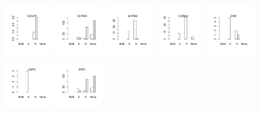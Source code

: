 \documentclass[utf8]{frontiersSCNS} %
\begin{document}
\begin{figure}[h!]
\includegraphics[width=0.19\textwidth]{figures/validation_plots/cckar_0p8_valplot.pdf}
\includegraphics[width=0.19\textwidth]{figures/validation_plots/chrm1_0p8_valplot.pdf}
\includegraphics[width=0.19\textwidth]{figures/validation_plots/chrm2_0p8_valplot.pdf}
\includegraphics[width=0.19\textwidth]{figures/validation_plots/chrm3_0p8_valplot.pdf}
\vspace*{-15pt} %
\includegraphics[width=0.19\textwidth]{figures/validation_plots/cnr1_0p8_valplot.pdf}
\includegraphics[width=0.19\textwidth]{figures/validation_plots/cnr2_0p8_valplot.pdf}
\includegraphics[width=0.19\textwidth]{figures/validation_plots/drd1_0p8_valplot.pdf}

\end{figure}
\end{document}
